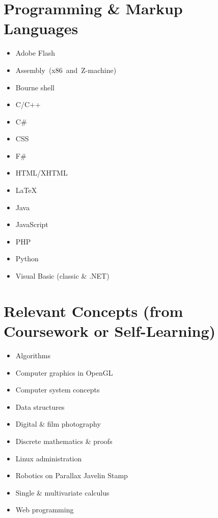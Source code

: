 \documentclass[11pt]{simplecv}
\begin{document}
  \newpage

  \section{Programming \& Markup Languages}
  \begin{multicols}{2}
    \begin{itemize}
      \item Adobe Flash
      \item Assembly\ (x86\ and\ Z-machine)
      \item Bourne shell
      \item C/C++
      \item C\#
      \item CSS
      \item F\#
      \item HTML/XHTML
      \item \LaTeX
      \item Java
      \item JavaScript
      \item PHP
      \item Python
      \item Visual Basic (classic \& .NET)
    \end{itemize}
  \end{multicols}

  \section{Relevant Concepts (from Coursework or Self-Learning)}
  \begin{multicols}{2}
    \begin{itemize}
      \item Algorithms
      \item Computer graphics in OpenGL
      \item Computer system concepts
      \item Data structures
      \item Digital \& film photography
      \item Discrete mathematics \& proofs
      \item Linux administration
      \item Robotics on Parallax Javelin Stamp
      \item Single \& multivariate calculus
      \item Web programming
    \end{itemize}
  \end{multicols}
\end{document}

